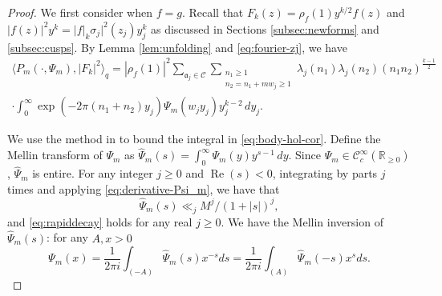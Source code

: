 \documentclass[12pt,reqno]{amsart}
\theoremstyle{remark}
\DeclareMathOperator{\Real}{Re}
\numberwithin{equation}{section}
\begin{document}
	\begin{proof} We first consider when $f=g$. 
		Recall that $F_k(z) = \rho_f(1)y^{k/2}f(z)$ and $|f(z)|^2y^k = |f|_k \sigma_j|^2(z_j)y_j^k$ as discussed in Sections \ref{subsec:newforms} and \ref{subsec:cusps}. By Lemma \ref{lem:unfolding} and \eqref{eq:fourier-zj}, we have
        \begin{multline}\label{eq:body-hol-cor}
				\langle P_m(\cdot, \Psi_m), |F_k|^2 \rangle_q 
				= |\rho_f(1)|^2 \sum_{\mathfrak{a}_j \in \mathcal{C}}  \sum_{\substack{n_1\ge 1\\ n_2 =n_1+mw_j \ge 1}}\lambda_j(n_1)\lambda_j(n_2) (n_1n_2)^{\frac{k-1}{2}}\\
                \cdot \int_{0}^{\infty} \exp(-2\pi(n_1+n_2)y_j)\Psi_m(w_jy_j)y_j^{k-2}\,dy_j.
		\end{multline}
		
		We use the method in  \cite[Section 2]{LS} to bound the integral in \eqref{eq:body-hol-cor}. Define the Mellin transform of $\Psi_m$ as $\widehat{\Psi}_m(s) = \int_0^{\infty}\Psi_m(y)y^{s-1}\,dy$. Since $\Psi_m \in \mathcal{C}_c^{\infty}(\mathbb{R}_{\ge 0})$, $\widehat{\Psi}_m$ is entire. For any integer $j \ge 0$ and $\Real(s)<0$,  integrating by parts $j$ times and applying  \eqref{eq:derivative-Psi_m}, we have that 
\begin{equation}\label{eq:rapiddecay}
		\widehat{\Psi}_m(s) \ll_j M^j/(1+|s|)^j, 
		\end{equation}
		and \eqref{eq:rapiddecay} holds for any real $j \ge 0$. We have the Mellin inversion of $\widehat{\Psi}_m(s)$: for any $A,x >0$
        \begin{equation}\label{eq:Mellin-inversion}
			\Psi_m(x) = \frac{1}{2\pi i} \int_{(-A)}\widehat{\Psi}_m(s)x^{-s} ds = \frac{1}{2\pi i} \int_{(A)}\widehat{\Psi}_m(-s)x^{s} ds. 
		\end{equation}
  

\end{proof}
\end{document}
